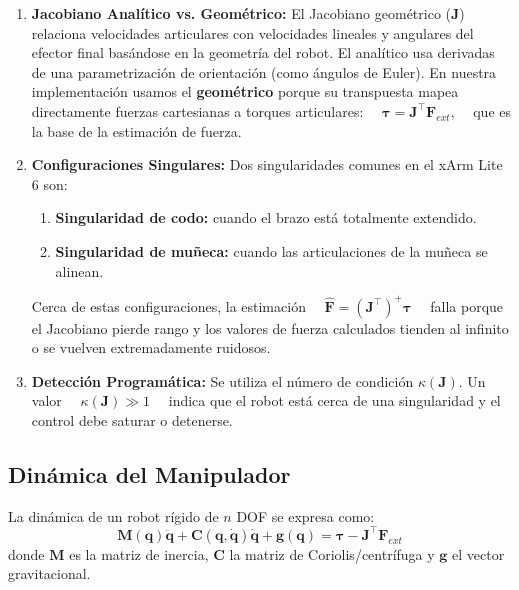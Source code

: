 \documentclass[journal,10pt,twoside]{IEEEtran}
\begin{document}
\begin{enumerate}[label=(\alph*)]
  \item \textbf{Jacobiano Analítico vs. Geométrico:} El Jacobiano geométrico ($\bm{J}$) relaciona velocidades articulares con velocidades lineales y angulares del efector final basándose en la geometría del robot. El analítico usa derivadas de una parametrización de orientación (como ángulos de Euler). En nuestra implementación usamos el \textbf{geométrico} porque su transpuesta mapea directamente fuerzas cartesianas a torques articulares:
  \
  \
  $\bm{\tau} = \bm{J}^{\top} \bm{F}_{ext}$,
  \
  \
  que es la base de la estimación de fuerza.

  \item \textbf{Configuraciones Singulares:} Dos singularidades comunes en el xArm Lite 6 son:
  \begin{enumerate}
    \item \textbf{Singularidad de codo:} cuando el brazo está totalmente extendido.
    \item \textbf{Singularidad de muñeca:} cuando las articulaciones de la muñeca se alinean.
  \end{enumerate}
  Cerca de estas configuraciones, la estimación
  \
  \
  $\hat{\bm{F}} = (\bm{J}^{\top})^{+} \bm{\tau}$
  \
  \
  falla porque el Jacobiano pierde rango y los valores de fuerza calculados tienden al infinito o se vuelven extremadamente ruidosos.

  \item \textbf{Detección Programática:} Se utiliza el número de condición $\kappa(\bm{J})$. Un valor
  \
  \
  $\kappa(\bm{J}) \gg 1$
  \
  \
  indica que el robot está cerca de una singularidad y el control debe saturar o detenerse.
\end{enumerate}

\subsection{Dinámica del Manipulador}

La dinámica de un robot rígido de $n$ DOF se expresa como:
\begin{equation}
  \bm{M}(\bm{q})\ddot{\bm{q}} + \bm{C}(\bm{q},\dot{\bm{q}})\dot{\bm{q}}
  + \bm{g}(\bm{q}) = \bm{\tau} - \bm{J}^\top\bm{F}_{ext}
  \label{eq:dynamics}
\end{equation}
donde $\bm{M}$ es la matriz de inercia, $\bm{C}$ la matriz de
Coriolis/centrífuga y $\bm{g}$ el vector gravitacional.
\end{document}
